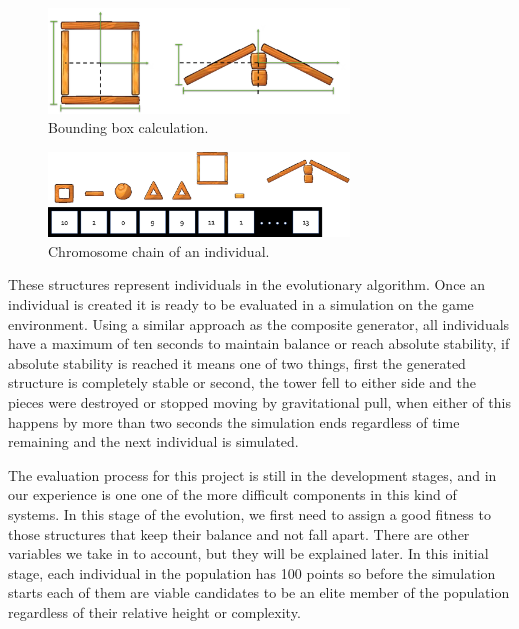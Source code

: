 \documentclass[conference]{IEEEtran}
\begin{document}
    \begin{figure}[htbp]
    \centerline{\includegraphics[width=80mm]{Images/bounding_box_calculation.png}}
    \caption{Bounding box calculation.}
    \label{bounding_boc_calc}
    \end{figure}
    
    \begin{figure}[htbp]
    \centerline{\includegraphics[width=80mm]{Images/chromosome_chain_example.png}}
    \caption{Chromosome chain of an individual.}
    \label{old_chrom}
    \end{figure}
    
    These structures represent individuals in the evolutionary algorithm. Once
    an individual is created it is ready to be evaluated in a simulation on the
    game environment. Using a similar approach as the composite generator, all
    individuals have a maximum of ten seconds to maintain balance or reach
    absolute stability, if absolute stability is reached it means one of two
    things, first the generated structure is completely stable or second, the
    tower fell to either side and the pieces were destroyed or stopped moving by
    gravitational pull, when either of this happens by more than two seconds the
    simulation ends regardless of time remaining and the next individual is
    simulated.

    The evaluation process for this project is still in the development stages,
    and in our experience is one one of the more difficult components in this
    kind of systems. In this stage of the evolution, we first need to assign a
    good fitness to those structures that keep their balance and not fall apart.
    There are other variables we take in to account, but they will be explained
    later. In this initial stage, each individual in the population has 100
    points so before the simulation starts each of them are viable candidates to
    be an elite member of the population regardless of their relative height or
    complexity.
    
\end{document}
